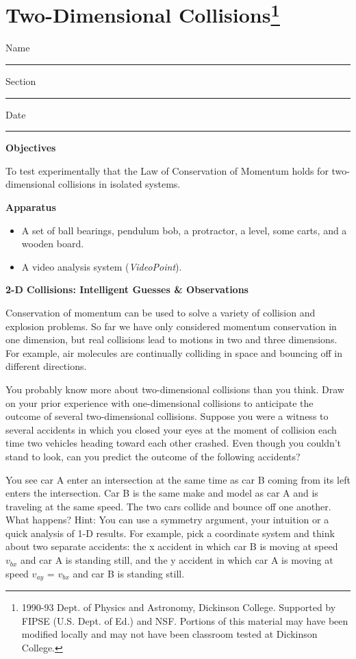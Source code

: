 
\section{Two-Dimensional Collisions\footnote{
1990-93 Dept. of Physics and Astronomy, Dickinson College. Supported by FIPSE
(U.S. Dept. of Ed.) and NSF. Portions of this material may have been modified
locally and may not have been classroom tested at Dickinson College.
}}

Name \rule{2.0in}{0.1pt}\hfill{}Section \rule{1.0in}{0.1pt}\hfill{}Date \rule{1.0in}{0.1pt}

\textbf{Objectives} 

To test experimentally that the Law of Conservation of Momentum holds for two-dimensional
collisions in isolated systems.

\textbf{Apparatus}

\begin{itemize}
\item A set of ball bearings, pendulum bob, a protractor, a level, some carts, and
a wooden board.
\item A video analysis system (\textit{VideoPoint}).
\end{itemize}
\textbf{2-D Collisions: Intelligent Guesses \& Observations }

Conservation of momentum can be used to solve a variety of collision and explosion
problems. So far we have only considered momentum conservation in one dimension,
but real collisions lead to motions in two and three dimensions. For example,
air molecules are continually colliding in space and bouncing off in different
directions. 

You probably know more about two-dimensional collisions than you think. Draw
on your prior experience with one-dimensional collisions to anticipate the outcome
of several two-dimensional collisions. Suppose you were a witness to several
accidents in which you closed your eyes at the moment of collision each time
two vehicles heading toward each other crashed. Even though you couldn't stand
to look, can you predict the outcome of the following accidents?

You see car A enter an intersection at the same time as car B coming from its
left enters the intersection. Car B is the same make and model as car A and
is traveling at the same speed. The two cars collide and bounce off one another.
What happens? Hint: You can use a symmetry argument, your intuition or a quick
analysis of 1-D results. For example, pick a coordinate system and think about
two separate accidents: the x accident in which car B is moving at speed \( v_{bx} \)
and car A is standing still, and the y accident in which car A is moving at
speed \( v_{ay} \) = \( v_{bx} \) and car B is standing still. 

